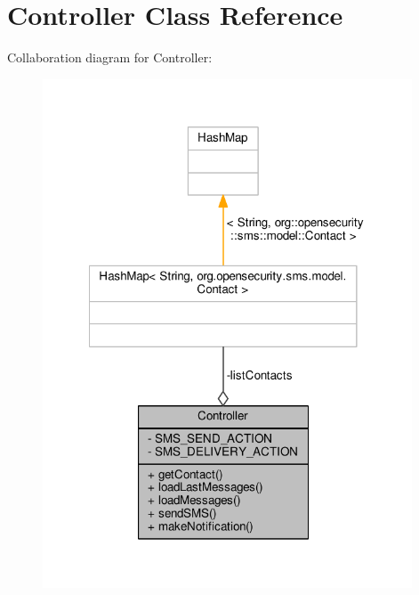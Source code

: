 \hypertarget{a00006}{\section{Controller Class Reference}
\label{a00006}
}


Collaboration diagram for Controller\+:
\nopagebreak
\begin{figure}[H]
\begin{center}
\leavevmode
\includegraphics[width=311pt]{a00042}
\end{center}
\end{figure}
